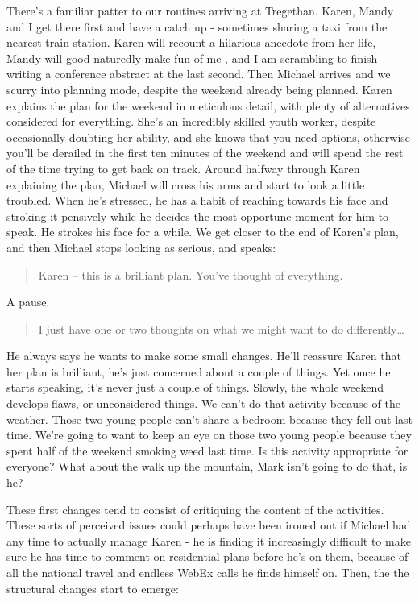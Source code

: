 There's a familiar patter to our routines arriving at Tregethan. Karen, Mandy and I get there first and have a catch up - sometimes sharing a taxi from the nearest train station. Karen will recount a hilarious anecdote from her life, Mandy will good-naturedly make fun of me , and I am scrambling to finish writing a conference abstract at the last second. Then Michael arrives and we scurry into planning mode, despite the weekend already being planned. Karen explains the plan for the weekend in meticulous detail, with plenty of alternatives considered for everything. She's an incredibly skilled youth worker, despite occasionally doubting her ability, and she knows that you need options, otherwise you'll be derailed in the first ten minutes of the weekend and will spend the rest of the time trying to get back on track. Around halfway through Karen explaining the plan, Michael will cross his arms and start to look a little troubled. When he’s stressed, he has a habit of reaching towards his face and stroking it pensively while he decides the most opportune moment for him to speak. He strokes his face for a while. We get closer to the end of Karen’s plan, and then Michael stops looking as serious, and speaks:
\begin{quote}
Karen – this is a brilliant plan. You’ve thought of everything.
\end{quote}
A pause. 
\begin{quote}
I just have one or two thoughts on what we might want to do differently…
\end{quote}
He always says he wants to make some small changes. He'll reassure Karen that her plan is brilliant, he’s just concerned about a couple of things. Yet once he starts speaking, it’s never just a couple of things. Slowly, the whole weekend develops flaws, or unconsidered things. We can’t do that activity because of the weather. Those two young people can’t share a bedroom because they fell out last time. We’re going to want to keep an eye on those two young people because they spent half of the weekend smoking weed last time. Is this activity appropriate for everyone? What about the walk up the mountain, Mark isn’t going to do that, is he? 

These first changes tend to consist of critiquing the content of the activities. These sorts of perceived issues could perhaps have been ironed out if Michael had any time to actually manage Karen - he is finding it increasingly difficult to make sure he has time to comment on residential plans before he's on them, because of all the national travel and endless WebEx calls he finds himself on. Then, the the structural changes start to emerge:

